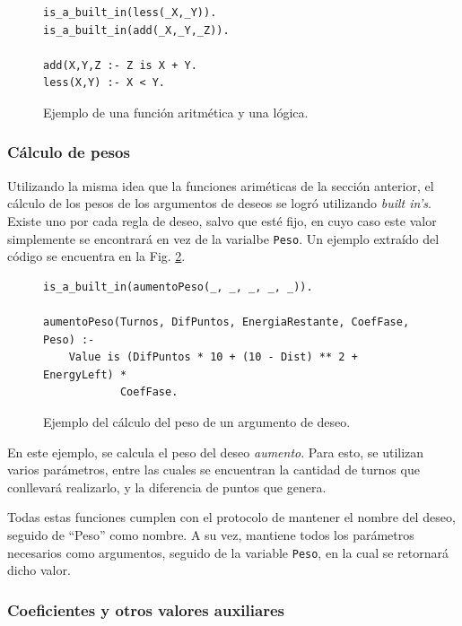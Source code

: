 \documentclass[oneside]{book}
\theoremstyle{definition}
\theoremstyle{example}
\begin{document}
\begin{figure}
\begin{verbatim}    
is_a_built_in(less(_X,_Y)).
is_a_built_in(add(_X,_Y,_Z)).

add(X,Y,Z :- Z is X + Y.
less(X,Y) :- X < Y.
\end{verbatim}

\caption{Ejemplo de una función aritmética y una lógica.}
\label{fig:funciones}
\end{figure}

\subsubsection{Cálculo de pesos}

Utilizando la misma idea que la funciones ariméticas de la sección anterior, el
cálculo de los pesos de los argumentos de deseos se logró utilizando \textit{built 
in's}. Existe uno por cada regla de deseo, salvo que esté fijo, en cuyo caso 
este valor simplemente se encontrará en vez de la varialbe \texttt{Peso}. Un 
ejemplo extraído del código se encuentra en la Fig. \ref{fig:calculoDePeso}.

\begin{figure}
\begin{verbatim}
is_a_built_in(aumentoPeso(_, _, _, _, _)).

aumentoPeso(Turnos, DifPuntos, EnergiaRestante, CoefFase, Peso) :-
    Value is (DifPuntos * 10 + (10 - Dist) ** 2 + EnergyLeft) * 
    		CoefFase.
\end{verbatim}

\caption{Ejemplo del cálculo del peso de un argumento de deseo.}
\label{fig:calculoDePeso}
\end{figure}

En este ejemplo, se calcula el peso del deseo \emph{aumento}. Para esto, se utilizan
varios parámetros, entre las cuales se encuentran la cantidad de turnos que 
conllevará realizarlo, y la diferencia de puntos que genera.

Todas estas funciones cumplen con el protocolo de mantener el nombre del deseo,
seguido de ``Peso'' como nombre. A su vez, mantiene todos los parámetros 
necesarios como argumentos, seguido de la variable \texttt{Peso}, en la cual se 
retornará dicho valor.

\subsubsection{Coeficientes y otros valores auxiliares}
\end{document}
